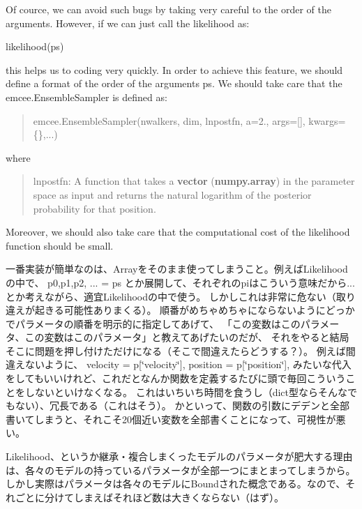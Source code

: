 Of cource, we can avoid such bugs by taking very careful to the order of the arguments. However, if we can just call the likelihood as\+:


\begin{DoxyCode}
likelihood(ps)
\end{DoxyCode}


this helps us to coding very quickly. In order to achieve this feature, we should define a format of the order of the arguments {\ttfamily ps}. We should take care that the {\ttfamily emcee.\+Ensemble\+Sampler} is defined as\+:

\begin{quote}
{\ttfamily emcee.\+Ensemble\+Sampler(nwalkers, dim, lnpostfn, a=2., args=\mbox{[}\mbox{]}, kwargs=\{\},...)} \end{quote}


where

\begin{quote}
{\ttfamily lnpostfn}\+: A function that takes a {\bfseries vector} ({\bfseries numpy.\+array}) in the parameter space as input and returns the natural logarithm of the posterior probability for that position. \end{quote}


Moreover, we should also take care that the computational cost of the likelihood function should be small.

一番実装が簡単なのは、\+Arrayをそのまま使ってしまうこと。例えば\+Likelihoodの中で、 p0,p1,p2, ... = ps とか展開して、それぞれのpiはこういう意味だから...とか考えながら、適宜\+Likelihoodの中で使う。 しかしこれは非常に危ない（取り違えが起きる可能性ありまくる）。 順番がめちゃめちゃにならないようにどっかでパラメータの順番を明示的に指定してあげて、 「この変数はこのパラメータ、この変数はこのパラメータ」と教えてあげたいのだが、 それをやると結局そこに問題を押し付けただけになる（そこで間違えたらどうする？）。 例えば間違えないように、 velocity = p\mbox{[}\char`\"{}velocity\char`\"{}\mbox{]}, position = p\mbox{[}\char`\"{}position\char`\"{}\mbox{]}, みたいな代入をしてもいいけれど、これだとなんか関数を定義するたびに頭で毎回こういうことをしないといけなくなる。 これはいちいち時間を食うし（dict型ならそんなでもない）、冗長である（これはそう）。 かといって、関数の引数にデデンと全部書いてしまうと、それこそ20個近い変数を全部書くことになって、可視性が悪い。

Likelihood、というか継承・複合しまくったモデルのパラメータが肥大する理由は、各々のモデルの持っているパラメータが全部一つにまとまってしまうから。 しかし実際はパラメータは各々のモデルに\+Boundされた概念である。なので、それごとに分けてしまえばそれほど数は大きくならない（はず）。

